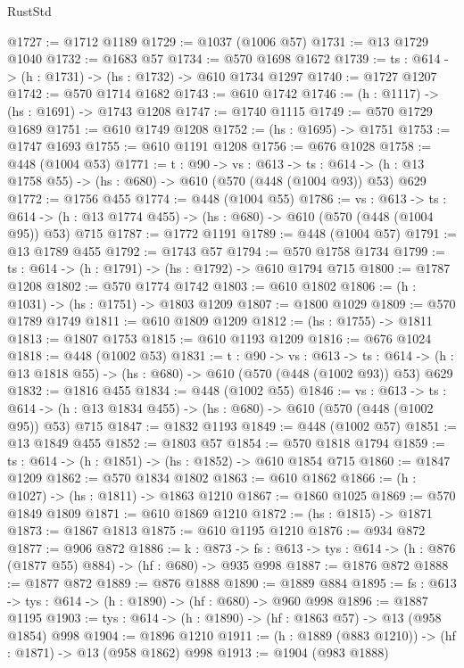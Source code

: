 \begin{lexlean}{RustStd}
\begin{coremodule}
@1727 := @1712 @1189
@1729 := @1037 (@1006 @57)
@1731 := @13 @1729 @1040
@1732 := @1683 @57
@1734 := @570 @1698 @1672
@1739 := {ts : @614} -> (h : @1731) -> (hs : @1732) -> @610 @1734 @1297
@1740 := @1727 @1207
@1742 := @570 @1714 @1682
@1743 := @610 @1742
@1746 := (h : @1117) -> (hs : @1691) -> @1743 @1208
@1747 := @1740 @1115
@1749 := @570 @1729 @1689
@1751 := @610 @1749 @1208
@1752 := (hs : @1695) -> @1751
@1753 := @1747 @1693
@1755 := @610 @1191 @1208
@1756 := @676 @1028
@1758 := @448 (@1004 @53)
@1771 := {t : @90} ->
  {vs : @613} ->
  {ts : @614} -> (h : @13 @1758 @55) -> (hs : @680) -> @610 (@570 (@448 (@1004 @93)) @53) @629
@1772 := @1756 @455
@1774 := @448 (@1004 @55)
@1786 := {vs : @613} ->
  {ts : @614} -> (h : @13 @1774 @455) -> (hs : @680) -> @610 (@570 (@448 (@1004 @95)) @53) @715
@1787 := @1772 @1191
@1789 := @448 (@1004 @57)
@1791 := @13 @1789 @455
@1792 := @1743 @57
@1794 := @570 @1758 @1734
@1799 := {ts : @614} -> (h : @1791) -> (hs : @1792) -> @610 @1794 @715
@1800 := @1787 @1208
@1802 := @570 @1774 @1742
@1803 := @610 @1802
@1806 := (h : @1031) -> (hs : @1751) -> @1803 @1209
@1807 := @1800 @1029
@1809 := @570 @1789 @1749
@1811 := @610 @1809 @1209
@1812 := (hs : @1755) -> @1811
@1813 := @1807 @1753
@1815 := @610 @1193 @1209
@1816 := @676 @1024
@1818 := @448 (@1002 @53)
@1831 := {t : @90} ->
  {vs : @613} ->
  {ts : @614} -> (h : @13 @1818 @55) -> (hs : @680) -> @610 (@570 (@448 (@1002 @93)) @53) @629
@1832 := @1816 @455
@1834 := @448 (@1002 @55)
@1846 := {vs : @613} ->
  {ts : @614} -> (h : @13 @1834 @455) -> (hs : @680) -> @610 (@570 (@448 (@1002 @95)) @53) @715
@1847 := @1832 @1193
@1849 := @448 (@1002 @57)
@1851 := @13 @1849 @455
@1852 := @1803 @57
@1854 := @570 @1818 @1794
@1859 := {ts : @614} -> (h : @1851) -> (hs : @1852) -> @610 @1854 @715
@1860 := @1847 @1209
@1862 := @570 @1834 @1802
@1863 := @610 @1862
@1866 := (h : @1027) -> (hs : @1811) -> @1863 @1210
@1867 := @1860 @1025
@1869 := @570 @1849 @1809
@1871 := @610 @1869 @1210
@1872 := (hs : @1815) -> @1871
@1873 := @1867 @1813
@1875 := @610 @1195 @1210
@1876 := @934 @872
@1877 := @906 @872
@1886 := {k : @873} ->
  {fs : @613} -> {tys : @614} -> (h : @876 (@1877 @55) @884) -> (hf : @680) -> @935 @998
@1887 := @1876 @872
@1888 := @1877 @872
@1889 := @876 @1888
@1890 := @1889 @884
@1895 := {fs : @613} -> {tys : @614} -> (h : @1890) -> (hf : @680) -> @960 @998
@1896 := @1887 @1195
@1903 := {tys : @614} -> (h : @1890) -> (hf : @1863 @57) -> @13 (@958 @1854) @998
@1904 := @1896 @1210
@1911 := (h : @1889 (@883 @1210)) -> (hf : @1871) -> @13 (@958 @1862) @998
@1913 := @1904 (@983 @1888)

\end{coremodule}
\end{lexlean}
